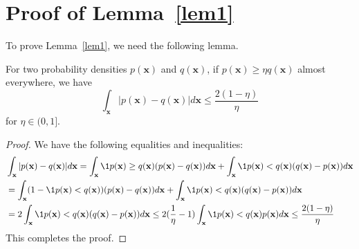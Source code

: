 \appendix

\section{Proof of Lemma~\ref{lem1}}\label{proof_a}
To prove Lemma~\ref{lem1}, we need the following lemma.

\begin{lemma}\label{lem3}
For two probability densities $p(\mathbf x)$ and $q(\mathbf x)$, if $p(\mathbf x)\geq \eta q(\mathbf x)$ almost everywhere, we have
$$
\int_\mathbf x |p(\mathbf x)-q(\mathbf x)|d\mathbf x \leq \dfrac{2(1-\eta)}{\eta}
$$
for $\eta\in(0,1]$.
\end{lemma}
\begin{proof}
We have the following equalities and inequalities:
\begin{equation}
\begin{aligned}
&\int_{\mathbf x} |p(\mathbf x)-q(\mathbf x)|d\mathbf x
=\int_\mathbf x \1{p(\mathbf x)\geq q(\mathbf x)} (p(\mathbf x)-q(\mathbf x))d\mathbf x
+\int_\mathbf x \1{p(\mathbf x)<q(\mathbf x)} (q(\mathbf x)-p(\mathbf x))d\mathbf x\\
&=\int_\mathbf x (1-\1{p(\mathbf x)< q(\mathbf x)}) (p(\mathbf x)-q(\mathbf x))d\mathbf x
+\int_\mathbf x \1{p(\mathbf x)<q(\mathbf x)} (q(\mathbf x)-p(\mathbf x))d\mathbf x\\
&=2\int_\mathbf x \1{p(\mathbf x)< q(\mathbf x)} (q(\mathbf x)-p(\mathbf x))d\mathbf x
\leq 2(\dfrac{1}{\eta}-1)\int_\mathbf x \1{p(\mathbf x)< q(\mathbf x)}  p(\mathbf x) d\mathbf x
\leq \dfrac{2(1-\eta)}{\eta}
\end{aligned}
\end{equation}
This completes the proof.
\end{proof}


